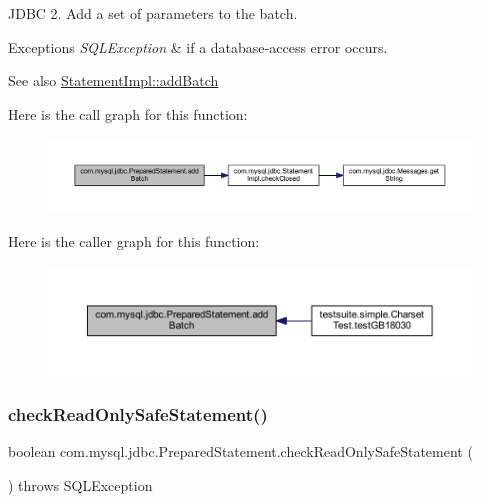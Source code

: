 J\+D\+BC 2. Add a set of parameters to the batch.


\begin{DoxyExceptions}{Exceptions}
{\em S\+Q\+L\+Exception} & if a database-\/access error occurs.\\
\hline
\end{DoxyExceptions}
\begin{DoxySeeAlso}{See also}
\mbox{\hyperlink{classcom_1_1mysql_1_1jdbc_1_1_statement_impl_a3ea3c4f24a3d1c9d4f9f9a9d29e53a02}{Statement\+Impl\+::add\+Batch}} 
\end{DoxySeeAlso}
Here is the call graph for this function\+:
\nopagebreak
\begin{figure}[H]
\begin{center}
\leavevmode
\includegraphics[width=350pt]{classcom_1_1mysql_1_1jdbc_1_1_prepared_statement_ade546357756baf1a168cc652c5a4de84_cgraph}
\end{center}
\end{figure}
Here is the caller graph for this function\+:
\nopagebreak
\begin{figure}[H]
\begin{center}
\leavevmode
\includegraphics[width=350pt]{classcom_1_1mysql_1_1jdbc_1_1_prepared_statement_ade546357756baf1a168cc652c5a4de84_icgraph}
\end{center}
\end{figure}
\mbox{\label{classcom_1_1mysql_1_1jdbc_1_1_prepared_statement_af96357c4ef89d1eae553d657f4989bcc}} 
\subsubsection{\texorpdfstring{check\+Read\+Only\+Safe\+Statement()}{checkReadOnlySafeStatement()}}
{\footnotesize\ttfamily boolean com.\+mysql.\+jdbc.\+Prepared\+Statement.\+check\+Read\+Only\+Safe\+Statement (\begin{DoxyParamCaption}{ }\end{DoxyParamCaption}) throws S\+Q\+L\+Exception\hspace{0.3cm}{\ttfamily [protected]}}

